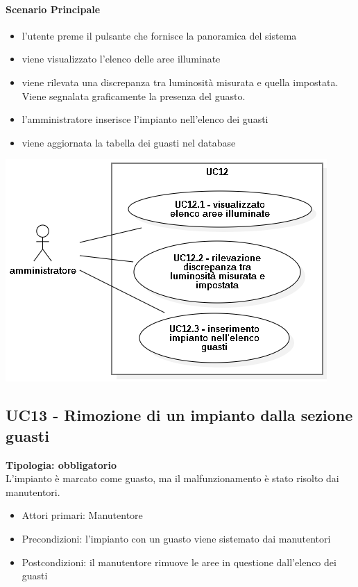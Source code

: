 \documentclass[12pt]{article}
\begin{document}
\paragraph{Scenario Principale}
\begin{itemize}
	\item l'utente preme il pulsante che fornisce la panoramica del sistema
	\item viene visualizzato l'elenco delle aree illuminate
	\item viene rilevata una discrepanza tra luminosità misurata e quella impostata. Viene segnalata graficamente la presenza del guasto.
	\item l'amministratore inserisce l'impianto nell'elenco dei guasti
	\item viene aggiornata la tabella dei guasti nel database
\end{itemize}

\includegraphics[scale=0.5]{UC12.png}

\subsection{UC13 - Rimozione di un impianto dalla sezione guasti}
\textbf{Tipologia: obbligatorio} \\
L'impianto è marcato come guasto, ma il malfunzionamento è stato risolto dai manutentori.
\begin{itemize}
	\item Attori primari: Manutentore
	\item Precondizioni: l'impianto con un guasto viene sistemato dai manutentori
	\item Postcondizioni: il manutentore rimuove le aree in questione dall'elenco dei guasti
\end{itemize}
\end{document}

